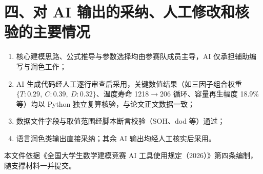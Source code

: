 \documentclass[UTF8,zihao=-4]{ctexart}
\begin{document}
\section*{四、对 AI 输出的采纳、人工修改和核验的主要情况}
\begin{sloppypar}
\begin{enumerate}[label=(\arabic*)]
\item 核心建模思路、公式推导与参数选择均由参赛队成员主导，AI 仅承担辅助编写与润色工作；
\item AI 生成代码经人工逐行审查后采用，关键数值结果（如三因子组合权重 $\{T:0.29,\ C:0.39,\ D:0.32\}$、温度寿命 1218$\to$206 循环、容量再生幅度 18.9\% 等）均以 Python 独立复算核验，与论文正文数据一致；
\item 数据文件字段与取值范围经脚本断言校验（SOH、dod 等）通过；
\item 语言润色类输出直接采纳；其余 AI 输出均经人工核实后采用。
\end{enumerate}
\end{sloppypar}

\vfill
\begin{center}
本文件依据《全国大学生数学建模竞赛 AI 工具使用规定（2026）》第四条编制，随支撑材料一并提交。
\end{center}
\end{document}

